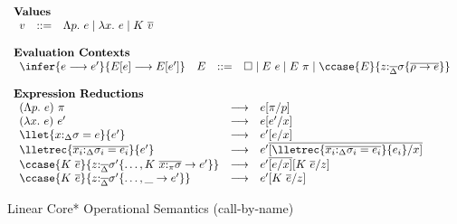 
\begin{figure}[h]
\begin{framed}
\small
\[
\begin{array}{l}
%
\textbf{Values} \\
\begin{array}{lcl}
    v & ::= & \Lambda p.~e \mid \lambda x.~e \mid K~\overline{v} \\
\end{array}\\\\
%
\textbf{Evaluation Contexts}\\
\begin{array}{llcl}
\infer{e \longrightarrow e'}{E[e] \longrightarrow E[e']} & E & ::= & \square \mid E~e \mid E~\pi \mid \ccase{E}{z{:}_{\overline{\Delta}}\sigma \{\overline{\rho \to e}\}} \\
\end{array}\\\\
%
\textbf{Expression Reductions}\\
\begin{array}{lcl}
(\Lambda p.~e)~\pi & \longrightarrow & e[\pi/p]\\
%
(\lambda x.~e)~e' & \longrightarrow & e[e'/x]\\
%
\llet{x{:}_\Delta\sigma = e}{e'} & \longrightarrow & e'[e/x]\\
%
\lletrec{\overline{x_i{:}_\Delta\sigma_i = e_i}}{e'} & \longrightarrow &
    e'\overline{[\lletrec{\overline{x_i{:}_\Delta\sigma_i = e_i}}{e_i}/x]}\\
%
\ccase{K~\overline{e}}{z{:}_{\overline{\Delta}}\sigma' \{\dots, K~\overline{x{:}_\pi\sigma} \to e'\}} &
\longrightarrow & e'\overline{[e/x]}[K~\overline{e}/z]\\
%
\ccase{K~\overline{e}}{z{:}_{\overline{\Delta}}\sigma' \{\dots, \_ \to e'\}} & \longrightarrow & e'[K~\overline{e}/z]\\
\end{array}
\end{array}
\]
\end{framed}
\caption{Linear Core* Operational Semantics \small(call-by-name)}
\label{linear-core-operational-semantics}
\end{figure}

